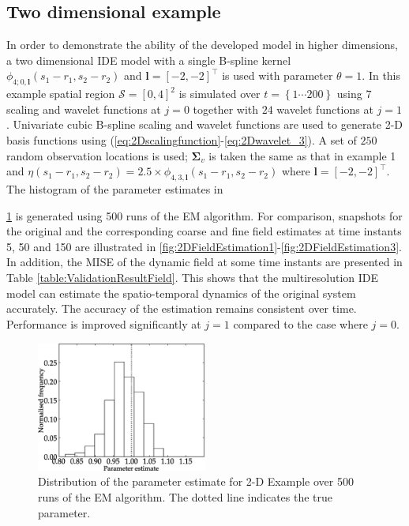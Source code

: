 \documentclass[11pt,draftcls,onecolumn,peerreview]{IEEEtran}
\begin{document}
{\subsection{Two dimensional example}
In order to demonstrate the ability of the developed model in higher dimensions, a two dimensional IDE model with a single B-spline kernel $\phi_{4;0,\mathbf{l}}\left(s_1-r_1,s_2-r_2\right) $ and $\mathbf l=[-2,-2]^ \top$ is used with parameter $\theta=1$. In this example spatial region $\mathcal{S}=[0,4]^2 $ is simulated over $t=\left\lbrace1 \cdots 200  \right\rbrace $ using $7$ scaling and wavelet functions at $j=0$ together with $24$ wavelet functions at $j=1$. Univariate cubic B-spline scaling and wavelet functions are used to generate 2-D basis functions using (\ref{eq:2Dscalingfunction}-\ref{eq:2Dwavelet_3}). A set of $250$ random  observation locations is used; $\mathbf{\Sigma}_v$ is taken the same as that in example 1 and $ \eta\left(s_1-r_1,s_2-r_2\right) =2.5\times\phi_{4,3,\mathbf{l}}\left(s_1-r_1,s_2-r_2\right)$ where $\mathbf l=[-2,-2]^ \top$. The histogram of the parameter estimates  in \figurename{\ref{fig:2DHist} is generated using 500 runs of the EM algorithm. For comparison, snapshots for the original and the corresponding coarse and fine field estimates at time instants 5, 50 and 150 are illustrated in \figurename{\ref{fig:2DFieldEstimation1}-\ref{fig:2DFieldEstimation3}}. In addition, the MISE of the dynamic field at some time instants are presented in Table \ref{table:ValidationResultField}.  This shows that the multiresolution IDE model can estimate the spatio-temporal dynamics of the original system accurately. The accuracy of the estimation remains consistent over time. Performance is improved significantly at $j=1$ compared to the case where $j=0$.
\begin{figure}[!t] 
\centering
\includegraphics[width=0.5\textwidth]{./Graph/aram5.eps}
\caption{Distribution of the parameter estimate for 2-D Example over 500 runs of the EM algorithm. The dotted line indicates the true parameter.}
\label{fig:2DHist}

\end{figure}}}
\end{document}

